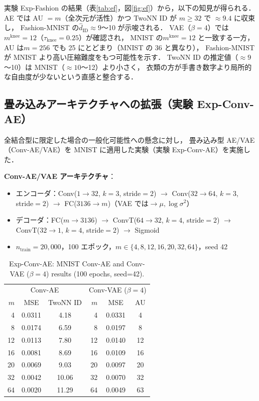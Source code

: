 \documentclass[11pt,a4paper]{jsarticle}
\newcommand{\mknee}{m^{\mathrm{knee}}}
\begin{document}
実験 Exp-Fashion の結果（表\ref{tab:ef}，図\ref{fig:ef}）から，以下の知見が得られる．
AE では AU $= m$（全次元が活性）かつ TwoNN ID が $m \geq 32$ で $\approx 9.4$ に収束し，
Fashion-MNIST の$\hat{d}_\mathrm{ID} \approx 9$〜10 が示唆される．
VAE（$\beta=4$）では$\mknee = 12$（$\tau_{\mathrm{knee}} = 0.25$）が確認され，
MNIST の$\mknee = 12$ と一致する一方，AU は$m = 256$ でも 25 にとどまり（MNIST の 36 と異なり），
Fashion-MNIST が MNIST より高い圧縮難度をもつ可能性を示す．
TwoNN ID の推定値（$\approx 9$〜10）は MNIST（$\approx 10$〜12）より小さく，
衣類の方が手書き数字より局所的な自由度が少ないという直感と整合する．

\subsection{畳み込みアーキテクチャへの拡張（実験 Exp-Conv-AE）}\label{sec:exp_conv}

全結合型に限定した場合の一般化可能性への懸念に対し，
畳み込み型 AE/VAE（Conv-AE/VAE）を MNIST に適用した実験（実験 Exp-Conv-AE）を実施した．

\textbf{Conv-AE/VAE アーキテクチャ}：
\begin{itemize}
  \item エンコーダ：Conv($1\to32$, $k=3$, stride$=2$) $\to$ Conv($32\to64$, $k=3$, stride$=2$)
        $\to$ FC($3136\to m$)（VAE では$\to \mu, \log\sigma^2$）
  \item デコーダ：FC($m\to3136$) $\to$ ConvT($64\to32$, $k=4$, stride$=2$) $\to$
        ConvT($32\to1$, $k=4$, stride$=2$) $\to$ Sigmoid
  \item $n_{\mathrm{train}} = 20{,}000$，100 エポック，$m \in \{4, 8, 12, 16, 20, 32, 64\}$，seed 42
\end{itemize}

\begin{table}[H]
\centering
\caption{Exp-Conv-AE: MNIST Conv-AE and Conv-VAE ($\beta=4$) results (100 epochs, seed=42).}
\label{tab:eg}
\small
\begin{tabular}{rcc|rcc}
\toprule
\multicolumn{3}{c|}{Conv-AE} & \multicolumn{3}{c}{Conv-VAE ($\beta=4$)} \\
$m$ & MSE & TwoNN ID & $m$ & MSE & AU \\
\midrule
 4  & 0.0311 & 4.18  &  4  & 0.0331 &  4 \\
 8  & 0.0174 & 6.59  &  8  & 0.0197 &  8 \\
12  & 0.0113 & 7.80  & 12  & 0.0140 & 12 \\
16  & 0.0081 & 8.69  & 16  & 0.0109 & 16 \\
20  & 0.0069 & 9.03  & 20  & 0.0097 & 20 \\
32  & 0.0042 & 10.06 & 32  & 0.0070 & 32 \\
64  & 0.0020 & 11.29 & 64  & 0.0049 & 63 \\
\bottomrule
\end{tabular}
\end{table}
\end{document}

